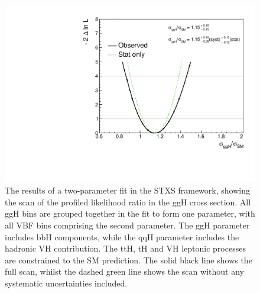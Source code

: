 \begin{figure}[hptb]
  \centering
  \includegraphics[width=\textwidth]{Figures/Results/ObsStage0_r_ggH.pdf}
  \caption[Likelihood scan for the ggH parameter in a two-parameter fit.]
  {
    The results of a two-parameter fit in the STXS framework,
    showing the scan of the profiled likelihood ratio in the ggH cross section.
    All ggH bins are grouped together in the fit to form one parameter, 
    with all VBF bins comprising the second parameter.
    The ggH parameter includes bbH components, 
    while the qqH parameter includes the hadronic VH contribution. 
    The ttH, tH and VH leptonic processes are constrained to the SM prediction. 
    The solid black line shows the full scan, 
    whilst the dashed green line shows the scan without any systematic uncertainties included.
  }
  \label{fig:results_Stage0_ggH}
\end{figure}

